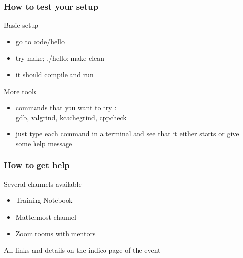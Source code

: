 \documentclass[compress]{beamer}
\begin{document}
\begin{frame}
  \frametitle{How to test your setup}
  \begin{exampleblock}{Basic setup}
    \begin{itemize}
    \item go to code/hello
    \item try make; ./hello; make clean
    \item it should compile and run
    \end{itemize}
  \end{exampleblock}
  \begin{alertblock}{More tools}
    \begin{itemize}
    \item commands that you want to try :\\ gdb, valgrind, kcachegrind, cppcheck
    \item just type each command in a terminal and see that it either starts or give some help message
    \end{itemize}
  \end{alertblock}
\end{frame}

\begin{frame}
  \frametitle{How to get help}
  \Large Several channels available
  \begin{itemize}
  \item Training Notebook
  \item Mattermost channel
  \item Zoom rooms with mentors
  \end{itemize}
  All links and details on the indico page of the event
\end{frame}
\end{document}
